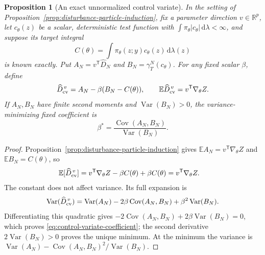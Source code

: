 \documentclass[11pt]{article}
\newtheorem{proposition}{Proposition}
\newcommand{\R}{\mathbb{R}}
\newcommand{\dd}{\mathrm{d}}
\begin{document}
\begin{proposition}[An exact unnormalized control variate]
\label{prop:disturbance-control-variate}
In the setting of Proposition~\ref{prop:disturbance-particle-induction},
fix a parameter direction $v\in\R^p$, let $c_\theta(z)$ be a scalar,
deterministic test function with $\int\pi_\theta|c_\theta|\,\dd\lambda<\infty$,
and suppose its target integral
\begin{equation}
 C(\theta)=\int\pi_\theta(z;y)c_\theta(z)\,\dd\lambda(z)
 \label{eq:control-known-integral}
\end{equation}
is known exactly. Put $A_N=v^{\mathsf T}\widehat D_N$ and
$B_N=\gamma_T^N(c_\theta)$. For any fixed scalar $\beta$, define
\begin{equation}
 \widehat D_{\rm cv}^{\,v}=A_N-\beta(B_N-C(\theta)),\qquad
 \mathbb E\widehat D_{\rm cv}^{\,v}=v^{\mathsf T}\nabla_\theta Z.
 \label{eq:disturbance-control-variate}
\end{equation}
If $A_N,B_N$ have finite second moments and
$\operatorname{Var}(B_N)>0$, the variance-minimizing fixed coefficient is
\begin{equation}
 \beta^*=\frac{\operatorname{Cov}(A_N,B_N)}
                 {\operatorname{Var}(B_N)}.
 \label{eq:control-variate-coefficient}
\end{equation}
\end{proposition}

\begin{proof}
Proposition~\ref{prop:disturbance-particle-induction} gives
$\mathbb E A_N=v^{\mathsf T}\nabla_\theta Z$ and
$\mathbb E B_N=C(\theta)$, so
\begin{align*}
 \mathbb E[\widehat D_{\rm cv}^{\,v}]
 &=v^{\mathsf T}\nabla_\theta Z-\beta C(\theta)+\beta C(\theta)
 =v^{\mathsf T}\nabla_\theta Z.
\end{align*}
The constant does not affect variance. Its full expansion is
\begin{equation}
 \operatorname{Var}(\widehat D_{\rm cv}^{\,v})
 =\operatorname{Var}(A_N)-2\beta\operatorname{Cov}(A_N,B_N)
       +\beta^2\operatorname{Var}(B_N).
 \label{eq:control-variate-variance}
\end{equation}
Differentiating this quadratic gives
$-2\operatorname{Cov}(A_N,B_N)+2\beta\operatorname{Var}(B_N)=0$,
which proves \eqref{eq:control-variate-coefficient}; the second derivative
$2\operatorname{Var}(B_N)>0$ proves the unique minimum. At the minimum the
variance is
$\operatorname{Var}(A_N)-\operatorname{Cov}(A_N,B_N)^2/
 \operatorname{Var}(B_N)$.
\end{proof}
\end{document}
